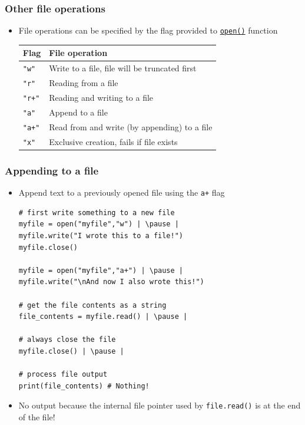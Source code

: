 \documentclass[xcolor=table]{beamer}
\begin{document}
\begin{frame}[fragile]
    \frametitle{Other file operations}
\begin{itemize}
    \item File operations can be specified by the flag provided to \href{https://docs.python.org/3/library/functions.html#open}{\texttt{open()}} function \pause 
\begin{center}
    \begin{tabular}{|l|l|}\hline
        Flag & File operation \\ \hline
        \texttt{"w"}
    & Write to a file, file will be truncated first \\
        \texttt{"r"} & Reading from a file \\
        \texttt{"r+"} & Reading and writing to a file \\
        \texttt{"a"} & Append to a file \\
        \texttt{"a+"} & Read from and write (by appending) to a file \\
        \texttt{"x"} & Exclusive creation, fails if file exists \\ \hline
    \end{tabular}
\end{center}
\end{itemize}
\end{frame}

\begin{frame}[fragile]
    \frametitle{Appending to a file}
\begin{itemize}
    \item Append text to a previously opened file using the \texttt{a+} flag
\begin{lstlisting}[style=python]
# first write something to a new file
myfile = open("myfile","w") | \pause |
myfile.write("I wrote this to a file!")
myfile.close()

myfile = open("myfile","a+") | \pause |
myfile.write("\nAnd now I also wrote this!")

# get the file contents as a string
file_contents = myfile.read() | \pause |

# always close the file
myfile.close() | \pause |

# process file output
print(file_contents) # Nothing!
\end{lstlisting} \pause 
    \item No output because the internal file pointer used by \texttt{file.read()} is at the end of the file!
\end{itemize}
\end{frame}
\end{document}
